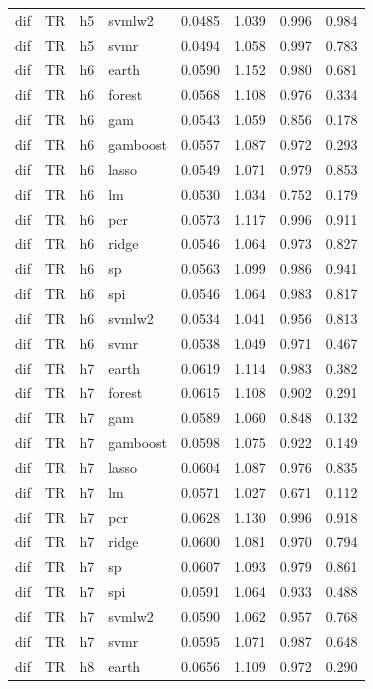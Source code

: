 \begin{ThreePartTable}
\begin{longtable}[t]{llclcccc}
dif & TR & h5 & svmlw2 & 0.0485 & 1.039 & 0.996 & 0.984\\
dif & TR & h5 & svmr & 0.0494 & 1.058 & 0.997 & 0.783\\
\addlinespace
dif & TR & h6 & earth & 0.0590 & 1.152 & 0.980 & 0.681\\
dif & TR & h6 & forest & 0.0568 & 1.108 & 0.976 & 0.334\\
dif & TR & h6 & gam & 0.0543 & 1.059 & 0.856 & 0.178\\
dif & TR & h6 & gamboost & 0.0557 & 1.087 & 0.972 & 0.293\\
dif & TR & h6 & lasso & 0.0549 & 1.071 & 0.979 & 0.853\\
dif & TR & h6 & lm & 0.0530 & 1.034 & 0.752 & 0.179\\
dif & TR & h6 & pcr & 0.0573 & 1.117 & 0.996 & 0.911\\
dif & TR & h6 & ridge & 0.0546 & 1.064 & 0.973 & 0.827\\
dif & TR & h6 & sp & 0.0563 & 1.099 & 0.986 & 0.941\\
dif & TR & h6 & spi & 0.0546 & 1.064 & 0.983 & 0.817\\
dif & TR & h6 & svmlw2 & 0.0534 & 1.041 & 0.956 & 0.813\\
dif & TR & h6 & svmr & 0.0538 & 1.049 & 0.971 & 0.467\\
\addlinespace
dif & TR & h7 & earth & 0.0619 & 1.114 & 0.983 & 0.382\\
dif & TR & h7 & forest & 0.0615 & 1.108 & 0.902 & 0.291\\
dif & TR & h7 & gam & 0.0589 & 1.060 & 0.848 & 0.132\\
dif & TR & h7 & gamboost & 0.0598 & 1.075 & 0.922 & 0.149\\
dif & TR & h7 & lasso & 0.0604 & 1.087 & 0.976 & 0.835\\
dif & TR & h7 & lm & 0.0571 & 1.027 & 0.671 & 0.112\\
dif & TR & h7 & pcr & 0.0628 & 1.130 & 0.996 & 0.918\\
dif & TR & h7 & ridge & 0.0600 & 1.081 & 0.970 & 0.794\\
dif & TR & h7 & sp & 0.0607 & 1.093 & 0.979 & 0.861\\
dif & TR & h7 & spi & 0.0591 & 1.064 & 0.933 & 0.488\\
dif & TR & h7 & svmlw2 & 0.0590 & 1.062 & 0.957 & 0.768\\
dif & TR & h7 & svmr & 0.0595 & 1.071 & 0.987 & 0.648\\
\addlinespace
dif & TR & h8 & earth & 0.0656 & 1.109 & 0.972 & 0.290\\

\end{longtable}
\end{ThreePartTable}
